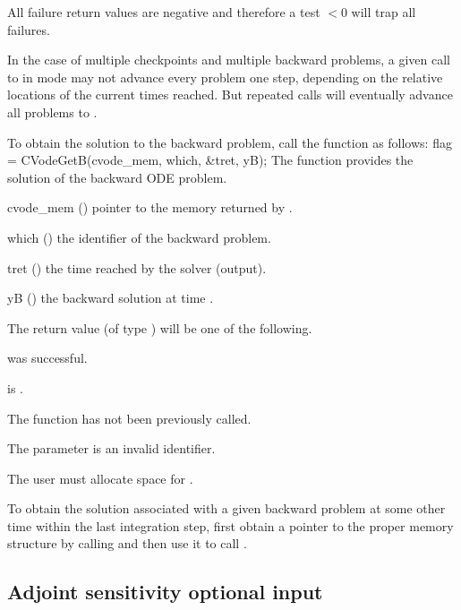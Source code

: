 {
  All failure return values are negative and therefore a test $< 0$
  will trap all  failures.

  In the case of multiple checkpoints and multiple backward problems, a given
  call to  in  mode may not advance every problem
  one step, depending on the relative locations of the current times reached.
  But repeated calls will eventually advance all problems to .
}
To obtain the solution  to the backward problem, call the function
 as follows:
{
  flag = CVodeGetB(cvode\_mem, which, \&tret, yB);
}
{
  The function  provides the solution  of the backward ODE
  problem.
}
{
  \begin{args}
  \item[cvode\_mem] ()
    pointer to the {\cvodes} memory returned by .
  \item[which] ()
    the identifier of the backward problem.
  \item[tret] ()
    the time reached by the solver (output).
  \item[yB] ()
    the backward solution at time .
  \end{args}
}
{
  The return value  (of type ) will be one of the following.
  \begin{args}
  \item[\Id{CV\_SUCCESS}]
     was successful.
  \item[\Id{CV\_MEM\_NULL}]
     is .
  \item[\Id{CV\_NO\_ADJ}]
    The function  has not been previously called.
   \item[\Id{CV\_ILL\_INPUT}]
    The parameter  is an invalid identifier.
  \end{args}
}
{
  {\warn}The user must allocate space for .

  To obtain the solution associated with a given backward problem at some
  other time within the last integration step, first obtain a pointer to the
  proper {\cvodes} memory structure by calling 
  and then use it to call .
}


\subsection{Adjoint sensitivity optional input}

